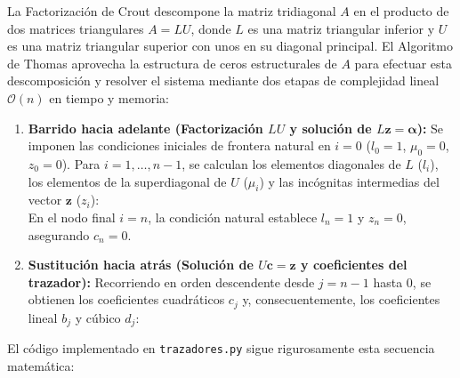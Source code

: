 \documentclass[11pt]{article}
\begin{document}
La Factorización de Crout descompone la matriz tridiagonal $A$ en el producto de dos matrices triangulares $A = L U$, donde $L$ es una matriz triangular inferior y $U$ es una matriz triangular superior con unos en su diagonal principal. El Algoritmo de Thomas aprovecha la estructura de ceros estructurales de $A$ para efectuar esta descomposición y resolver el sistema mediante dos etapas de complejidad lineal $\mathcal{O}(n)$ en tiempo y memoria:

\begin{enumerate}
    \item \textbf{Barrido hacia adelante (Factorización $LU$ y solución de $L \mathbf{z} = \boldsymbol{\alpha}$):}
    Se imponen las condiciones iniciales de frontera natural en $i = 0$ ($l_0 = 1$, $\mu_0 = 0$, $z_0 = 0$). Para $i = 1, \dots, n-1$, se calculan los elementos diagonales de $L$ ($l_i$), los elementos de la superdiagonal de $U$ ($\mu_i$) y las incógnitas intermedias del vector $\mathbf{z}$ ($z_i$):
    \\[
    l_i = 2(x_{i+1} - x_{i-1}) - h_{i-1} \mu_{i-1}, \qquad \mu_i = \frac{h_i}{l_i}, \qquad z_i = \frac{\alpha_i - h_{i-1} z_{i-1}}{l_i}.
    \\]
    En el nodo final $i = n$, la condición natural establece $l_n = 1$ y $z_n = 0$, asegurando $c_n = 0$.

    \item \textbf{Sustitución hacia atrás (Solución de $U \mathbf{c} = \mathbf{z}$ y coeficientes del trazador):}
    Recorriendo en orden descendente desde $j = n-1$ hasta $0$, se obtienen los coeficientes cuadráticos $c_j$ y, consecuentemente, los coeficientes lineal $b_j$ y cúbico $d_j$:
    \\[
    c_j = z_j - \mu_j c_{j+1}, \qquad b_j = \frac{a_{j+1} - a_j}{h_j} - \frac{h_j (c_{j+1} + 2c_j)}{3}, \qquad d_j = \frac{c_{j+1} - c_j}{3 h_j}.
    \\]
\end{enumerate}

El código implementado en \texttt{trazadores.py} sigue rigurosamente esta secuencia matemática:
\end{document}
